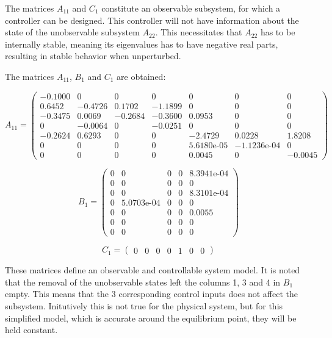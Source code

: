 The matrices $A_{11}$ and $C_{1}$ constitute an observable subsystem, for which a controller can be designed. This controller will not have information about the state of the unobservable subsystem $A_{22}$. This necessitates that $A_{22}$ has to be internally stable, meaning its eigenvalues has to have negative real parts, resulting in stable behavior when unperturbed.

The matrices $A_{11}$, $B_{1}$ and $C_{1}$ are obtained:

\begin{equation}  \label{eq:A11}
	A_{11} = \left(\begin{array}{ccccccc}
		-0.1000 & 0 & 0 & 0 & 0 & 0 & 0\\
		0.6452 & -0.4726 & 0.1702 & -1.1899 & 0 & 0 & 0\\
		-0.3475 & 0.0069 & -0.2684 & -0.3600 & 0.0953 & 0 & 0\\
		0 & -0.0064 & 0 & -0.0251 & 0 & 0 & 0\\
		-0.2624 & 0.6293 & 0 & 0 & -2.4729 & 0.0228 & 1.8208\\
		0 & 0 & 0 & 0 & \text{5.6180e-05} & -\text{1.1236e-04} & 0\\
		0 & 0 & 0 & 0 & 0.0045 & 0 & -0.0045
	\end{array}\right)
\end{equation}

\bigskip

\begin{equation}  \label{eq:B1}
	B_1 = \left(\begin{array}{ccccc}
		0 & 0 & 0 & 0 & \text{8.3941e-04}\\
		0 & 0 & 0 & 0 & 0\\
		0 & 0 & 0 & 0 & \text{8.3101e-04}\\
		0 & \text{5.0703e-04} & 0 & 0 & 0\\
		0 & 0 & 0 & 0 & 0.0055\\
		0 & 0 & 0 & 0 & 0\\
		0 & 0 & 0 & 0 & 0
	\end{array}\right)
\end{equation}


\medskip

\begin{equation}  \label{eq:C1}
	C_1 =\left(\begin{array}{ccccccc}
		0 & 0 & 0 & 0 & 1 & 0 & 0
	\end{array}\right)
\end{equation}

These matrices define an observable and controllable system model. It is noted that the removal of the unobservable states left the columns 1, 3 and 4 in $B_1$ empty. This means that the 3 corresponding control inputs does not affect the subsystem. Initutively this is not true for the physical system, but for this simplified model, which is accurate around the equilibrium point, they will be held constant.
